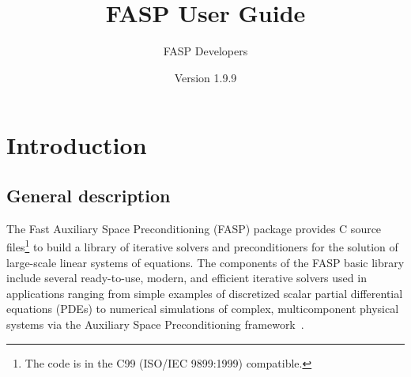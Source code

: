 \documentclass[11pt]{memoir}
\title{\Huge FASP User Guide}
\author{FASP Developers}
\date{\vfill Version 1.9.9} %
\begin{document}
\clearpage\maketitle
\thispagestyle{empty}

\newpage
\setcounter{page}{1}
\tableofcontents

\chapter{Introduction}\label{ch:intro}




\section{General description}
The Fast Auxiliary Space Preconditioning (FASP) package provides
C source files\footnote{The code is in the C99 (ISO/IEC 9899:1999) compatible.} to build a library of
iterative solvers and preconditioners for the solution of large-scale
linear systems of equations.  The components of the FASP basic library
include several ready-to-use, modern, and efficient iterative solvers
used in applications ranging from simple examples of discretized
scalar partial differential equations (PDEs) to numerical simulations
of complex, multicomponent physical systems via the Auxiliary Space
Preconditioning framework~\cite{Xu.Xu.2010ff}.
\end{document}
